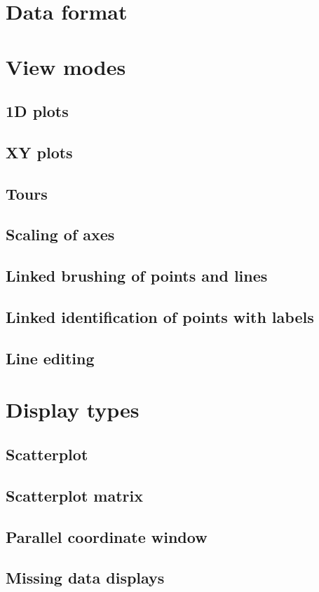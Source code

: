 \documentclass{article}
\begin{document}
\section{Data format}

\section{View modes}

\subsection{1D plots}
\subsection{XY plots}
\subsection{Tours}
\subsection{Scaling of axes}
\subsection{Linked brushing of points and lines}
\subsection{Linked identification of points with labels}
\subsection{Line editing}

\section {Display types}
\subsection{Scatterplot}
\subsection{Scatterplot matrix}
\subsection{Parallel coordinate window}
\subsection{Missing data displays}
\end{document}
